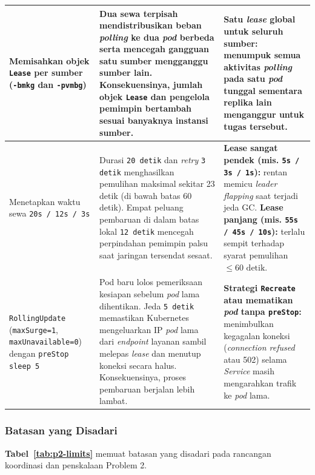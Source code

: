 \begin{small}
\begin{longtable}{@{} >{\raggedright\arraybackslash}p{3.4cm} >{\raggedright\arraybackslash}p{7.4cm} >{\raggedright\arraybackslash}p{4.0cm} @{}}
  \midrule
  Memisahkan objek \texttt{Lease} per sumber (\texttt{-bmkg} dan \texttt{-pvmbg}) & Dua sewa terpisah mendistribusikan beban \textit{polling} ke dua \textit{pod} berbeda serta mencegah gangguan satu sumber mengganggu sumber lain. Konsekuensinya, jumlah objek \texttt{Lease} dan pengelola pemimpin bertambah sesuai banyaknya instansi sumber. & \textbf{Satu \textit{lease} global untuk seluruh sumber:} menumpuk semua aktivitas \textit{polling} pada satu \textit{pod} tunggal sementara replika lain menganggur untuk tugas tersebut. \\
  \midrule
  Menetapkan waktu sewa \texttt{20s / 12s / 3s} & Durasi \texttt{20 detik} dan \textit{retry} \texttt{3 detik} menghasilkan pemulihan maksimal sekitar 23 detik (di bawah batas 60 detik). Empat peluang pembaruan di dalam batas lokal \texttt{12 detik} mencegah perpindahan pemimpin palsu saat jaringan tersendat sesaat. & \textbf{Lease sangat pendek (mis. \texttt{5s / 3s / 1s}):} rentan memicu \textit{leader flapping} saat terjadi jeda GC. \textbf{Lease panjang (mis. \texttt{55s / 45s / 10s}):} terlalu sempit terhadap syarat pemulihan $\le 60\text{ detik}$. \\
  \midrule
  \texttt{RollingUpdate} (\texttt{maxSurge=1}, \texttt{max\allowbreak Unavailable=0}) dengan \texttt{preStop sleep 5} & Pod baru lolos pemeriksaan kesiapan sebelum \textit{pod} lama dihentikan. Jeda \texttt{5 detik} memastikan Kubernetes mengeluarkan IP \textit{pod} lama dari \textit{endpoint} layanan sambil melepas \textit{lease} dan menutup koneksi secara halus. Konsekuensinya, proses pembaruan berjalan lebih lambat. & \textbf{Strategi \texttt{Recreate} atau mematikan \textit{pod} tanpa \texttt{preStop}:} menimbulkan kegagalan koneksi (\textit{connection refused} atau 502) selama \textit{Service} masih mengarahkan trafik ke \textit{pod} lama. \\
\end{longtable}
\end{small}

\subsubsection{Batasan yang Disadari}

\textbf{Tabel~\ref{tab:p2-limits}} memuat batasan yang disadari pada rancangan koordinasi dan penskalaan Problem 2.


